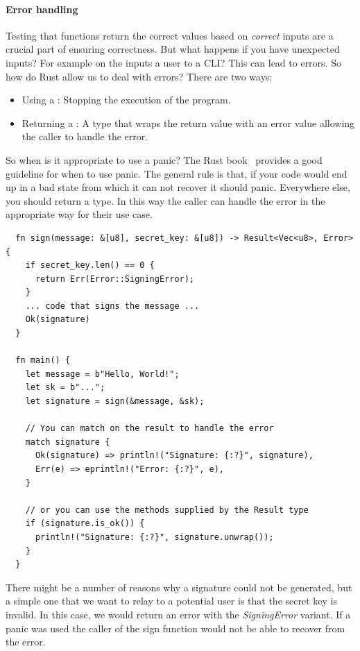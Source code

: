 \documentclass[11pt]{report}
\theoremstyle{definition}
\theoremstyle{plain}
\begin{document}
\paragraph{Error handling}\label{sec:rusterror} %
Testing that functions return the correct values based on \textit{correct} inputs are a crucial part of ensuring correctness. But what happens if you have unexpected inputs? For example on the inputs a user to a CLI\@? This can lead to errors. So how do Rust allow us to deal with errors? There are two ways:
\begin{itemize}
  \item Using a : Stopping the execution of the program.
  \item Returning a : A type that wraps the return value with an error value allowing the caller to handle the error.
\end{itemize}
So when is it appropriate to use a panic? The Rust book~\cite[ch.9.3]{rustlangRustProgramming} provides a good guideline for when to use panic.
The general rule is that, if your code would end up in a bad state from which it can not recover it should panic. Everywhere else, you should return a  type. In this way the caller can handle the error in the appropriate way for their use case.
\begin{verbatim}
  fn sign(message: &[u8], secret_key: &[u8]) -> Result<Vec<u8>, Error> {
    if secret_key.len() == 0 {
      return Err(Error::SigningError);
    }
    ... code that signs the message ...
    Ok(signature)
  }

  fn main() {
    let message = b"Hello, World!";
    let sk = b"...";
    let signature = sign(&message, &sk);

    // You can match on the result to handle the error
    match signature {
      Ok(signature) => println!("Signature: {:?}", signature),
      Err(e) => eprintln!("Error: {:?}", e),
    }

    // or you can use the methods supplied by the Result type
    if (signature.is_ok()) {
      println!("Signature: {:?}", signature.unwrap());
    } 
  }
\end{verbatim}
There might be a number of reasons why a signature could not be generated, but a simple one that we want to relay to a potential user is that the secret key is invalid. In this case, we would return an error with the \textit{SigningError} variant. If a panic was used the caller of the sign function would not be able to recover from the error.
\end{document}
